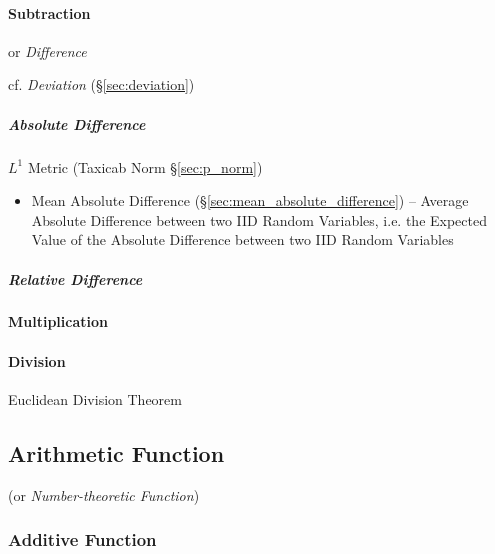 \paragraph{Subtraction}\label{sec:subtraction}\hfill

or \emph{Difference}

cf. \emph{Deviation} (\S\ref{sec:deviation})



\subparagraph{Absolute Difference}\label{sec:absolute_difference}\hfill


$L^1$ Metric (Taxicab Norm \S\ref{sec:p_norm})

\begin{itemize}
  \item Mean Absolute Difference (\S\ref{sec:mean_absolute_difference}) --
    Average Absolute Difference between two IID Random Variables, i.e. the
    Expected Value of the Absolute Difference between two IID Random Variables
\end{itemize}



\subparagraph{Relative Difference}\label{sec:relative_difference}\hfill




\paragraph{Multiplication}\label{sec:multiplication}\hfill

\paragraph{Division}\label{sec:division}\hfill

Euclidean Division Theorem



\subsection{Arithmetic Function}\label{sec:arithmetic_function}

(or \emph{Number-theoretic Function})



\subsubsection{Additive Function}\label{sec:additive_function}

